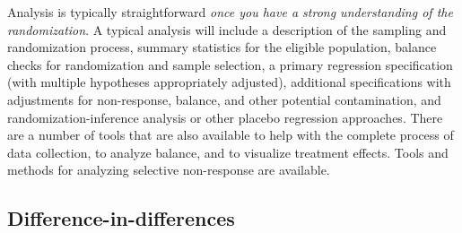 Analysis is typically straightforward \textit{once you have a strong understanding of the randomization}.
A typical analysis will include a description of the sampling and randomization process,
summary statistics for the eligible population,
balance checks for randomization and sample selection,
a primary regression specification (with multiple hypotheses appropriately adjusted),
additional specifications with adjustments for non-response, balance, and other potential contamination,
and randomization-inference analysis or other placebo regression approaches.
There are a number of tools that are also available
to help with the complete process of data collection,
to analyze balance,
and to visualize treatment effects.
Tools and methods for analyzing selective non-response are available.

\subsection{Difference-in-differences}


